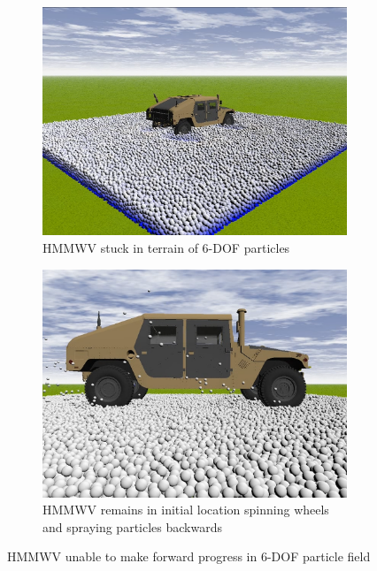 \documentclass[12pt,onecolumn]{report}
\begin{document}
\begin{figure}
	\centering
	\begin{subfigure}[b]{0.49\columnwidth}
		\centering
		\includegraphics[width=\textwidth]{Figs/stuck.png}
		\caption{{\small HMMWV stuck in terrain of 6-DOF particles}}   
		\label{fig:stuck}
	\end{subfigure}
	\hfill
	\begin{subfigure}[b]{0.49\columnwidth}
		\centering
		\includegraphics[width=\columnwidth]{Figs/HMMWV_spray.png}
		\caption{\small HMMWV remains in initial location spinning wheels and spraying particles backwards}   
		\label{fig:spray}
	\end{subfigure}
	\caption{\small HMMWV unable to make forward progress in 6-DOF particle field}
	\label{fig:spinOut}
\end{figure}
\end{document}
